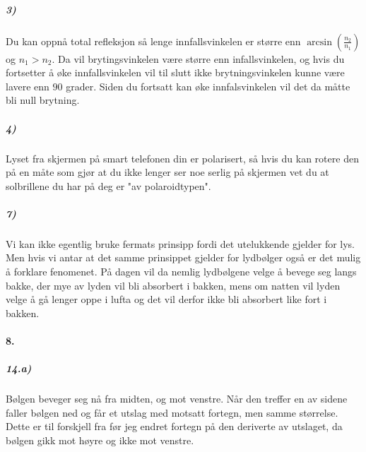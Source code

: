 \documentclass[11pt, A4paper,norsk]{article}
\begin{document}
			\subparagraph{3)}
				\begin{flushleft}
Du kan oppnå total refleksjon så lenge innfallsvinkelen er større enn $\arcsin\left( \frac{n_2}{n_1} \right)$ og $n_1 > n_2$. Da vil brytingsvinkelen være større enn infallsvinkelen, og hvis du fortsetter å øke innfallsvinkelen vil til slutt ikke brytningsvinkelen kunne være lavere enn $90$ grader. Siden du fortsatt kan øke innfalsvinkelen vil det da måtte bli null brytning.
				\end{flushleft}












			\subparagraph{4)}
				\begin{flushleft}
Lyset fra skjermen på smart telefonen din er polarisert, så hvis du kan rotere den på en måte som gjør at du ikke lenger ser noe serlig på skjermen vet du at solbrillene du har på deg er "av polaroidtypen".
				\end{flushleft}












			\subparagraph{7)}
				\begin{flushleft}
Vi kan ikke egentlig bruke fermats prinsipp fordi det utelukkende gjelder for lys. Men hvis vi antar at det samme prinsippet gjelder for lydbølger også er det mulig å forklare fenomenet. På dagen vil da nemlig lydbølgene velge å bevege seg langs bakke, der mye av lyden vil bli absorbert i bakken, mens om natten vil lyden velge å gå lenger oppe i lufta og det vil derfor ikke bli absorbert like fort i bakken.
				\end{flushleft}








		\paragraph{8.}
			\subparagraph{14.a)}
				\begin{flushleft}
Bølgen beveger seg nå fra midten, og mot venstre. Når den treffer en av sidene faller bølgen ned og får et utslag med motsatt fortegn, men samme størrelse. Dette er til forskjell fra før jeg endret fortegn på den deriverte av utslaget, da bølgen gikk mot høyre og ikke mot venstre.
				\end{flushleft}
\end{document}
